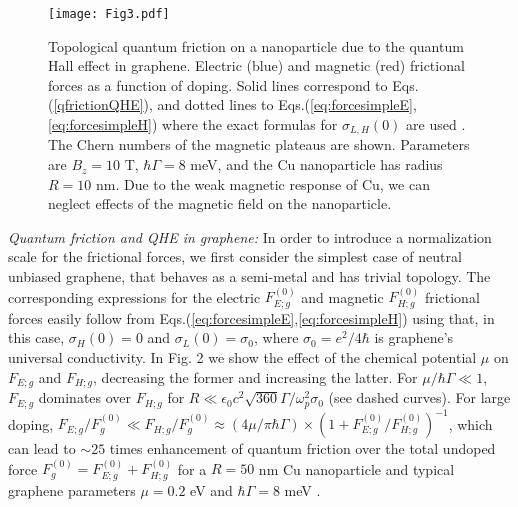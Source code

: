 \documentclass[10pt,aps,prl,superscriptaddress,showpacs,twocolumn]{revtex4-1}
\begin{document}


\begin{figure}[t]
\centering
\texttt{[image: Fig3.pdf]}
\caption{Topological quantum friction on a nanoparticle due to the quantum Hall effect in graphene. Electric (blue) and magnetic (red) frictional forces as a function of doping. Solid lines correspond to Eqs.(\ref{qfrictionQHE}), and dotted lines to  
Eqs.(\ref{eq:forcesimpleE},\ref{eq:forcesimpleH}) where the exact formulas for $\sigma_{L,H}(0)$ are used \cite{Gusynin2007,Ferreira2012}. The Chern numbers of the magnetic plateaus are shown. Parameters are $B_z=10$ T, $\hbar \Gamma=8$ meV, and the Cu nanoparticle has radius $R=10$ nm. Due to the weak magnetic response of Cu, we can neglect effects of the magnetic field on the nanoparticle. 
} 
\label{Fig3}
\end{figure}




{\it Quantum friction and QHE in graphene:}
In order to introduce a normalization scale for the frictional forces, we first consider the simplest case of neutral unbiased graphene, that behaves as a semi-metal and has trivial topology. The corresponding expressions for the electric $F^{(0)}_{E;g}$ and magnetic $F^{(0)}_{H;g}$ frictional forces easily follow from Eqs.(\ref{eq:forcesimpleE},\ref{eq:forcesimpleH}) using that, in this case, $\sigma_H(0)=0$ and $\sigma_L(0)=\sigma_0$, where $\sigma_0=e^2/4 \hbar$ is graphene's universal conductivity. 
In Fig. 2 we show the effect of the chemical potential $\mu$ on $F_{E;g}$ and $F_{H;g}$, decreasing the former and increasing the latter.  For $\mu/\hbar \Gamma \ll 1$, $F_{E;g}$ dominates over $F_{H;g}$
for $R \ll \epsilon_0 c^2 \sqrt{360} \Gamma/\omega_p^2 \sigma_0$ (see dashed curves).  For large doping, 
$F_{E;g}/F^{(0)}_{g} \ll F_{H;g}/F^{(0)}_{g} \approx (4 \mu/\pi \hbar \Gamma) \times (1+F_{E;g}^{(0)}/F_{H;g}^{(0)})^{-1} $, 
which can lead to $\sim 25$ times enhancement of quantum friction over the total undoped force 
$F^{(0)}_{g} =F^{(0)}_{E;g}+F^{(0)}_{H;g}$ for
a $R=50$ nm Cu nanoparticle and typical graphene parameters $\mu=0.2$ eV and $\hbar \Gamma=8$ meV
\cite{Peresbook}.
\end{document}
